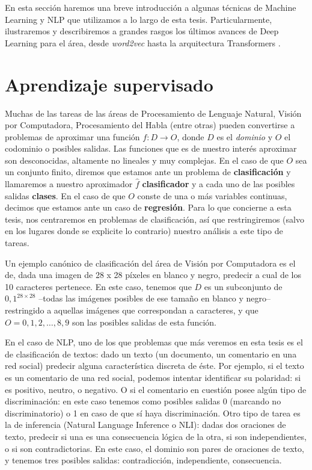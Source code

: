 En esta sección haremos una breve introducción a algunas técnicas de Machine Learning y NLP que utilizamos a lo largo de esta tesis. Particularmente, ilustraremos y describiremos a grandes rasgos los últimos avances de Deep Learning para el área, desde \emph{word2vec} \cite{mikolov2013distributed} hasta la arquitectura Transformers \cite{vaswani2017attention}.

\section{Aprendizaje supervisado}

Muchas de las tareas de las áreas de Procesamiento de Lenguaje Natural, Visión por Computadora, Procesamiento del Habla (entre otras) pueden convertirse a problemas de aproximar una función $f: D \rightarrow O$, donde $D$ es el \emph{dominio} y $O$ el codominio o posibles salidas. Las funciones que es de nuestro interés aproximar son desconocidas, altamente no lineales y muy complejas. En el caso de que $O$ sea un conjunto finito, diremos que estamos ante un problema de \textbf{clasificación} y llamaremos a nuestro aproximador $\widehat{f}$ \textbf{clasificador} y a cada uno de las posibles salidas \textbf{clases}. En el caso de que $O$ conste de una o más variables continuas, decimos que estamos ante un caso de \textbf{regresión}. Para lo que concierne a esta tesis, nos centraremos en problemas de clasificación, así que restringiremos (salvo en los lugares donde se explicite lo contrario) nuestro análisis a este tipo de tareas.

Un ejemplo canónico de clasificación del área de Visión por Computadora es el de, dada una imagen de 28 x 28 píxeles en blanco y negro, predecir a cual de los 10 caracteres pertenece. En este caso, tenemos que $D$ es un subconjunto de ${0, 1}^{28 \times 28}$ --todas las imágenes posibles de ese tamaño en blanco y negro-- restringido a aquellas imágenes que correspondan a caracteres, y que $O = {0, 1, 2, \ldots, 8, 9}$ son las posibles salidas de esta función.

En el caso de NLP, uno de los que problemas que más veremos en esta tesis es el de clasificación de textos: dado un texto (un documento, un comentario en una red social) predecir alguna característica discreta de éste. Por ejemplo, si el texto es un comentario de una red social, podemos intentar identificar su polaridad: si es positivo, neutro, o negativo. O si el comentario en cuestión posee algún tipo de discriminación: en este caso tenemos como posibles salidas 0 (marcando no discriminatorio) o 1 en caso de que sí haya discriminación. Otro tipo de tarea es la de inferencia (Natural Language Inference o NLI): dadas dos oraciones de texto, predecir si una es una consecuencia lógica de la otra, si son independientes, o si son contradictorias. En este caso, el dominio son pares de oraciones de texto, y tenemos tres posibles salidas: contradicción, independiente, consecuencia.

